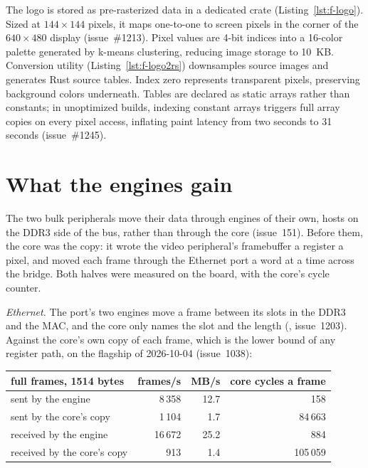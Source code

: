 \documentclass[journal,9pt]{IEEEtran}
\begin{document}


The logo is stored as pre-rasterized data in a dedicated crate
(Listing~\ref{lst:f-logo}). Sized at $144\times144$ pixels, it maps one-to-one
to screen pixels in the corner of the $640\times480$ display (issue~\#1213).
Pixel values are 4-bit indices into a 16-color palette generated by k-means
clustering, reducing image storage to 10~KB. Conversion utility
 (Listing~\ref{lst:f-logo2rs}) downsamples source images
and generates Rust source tables. Index zero represents transparent pixels,
preserving background colors underneath. Tables are declared as static arrays
rather than constants; in unoptimized builds, indexing constant arrays triggers
full array copies on every pixel access, inflating paint latency from two
seconds to 31 seconds (issue~\#1245).





\section{What the engines gain}
\label{sec:f-dma}

The two bulk peripherals move their data through engines of their own,
hosts on the DDR3 side of the bus, rather than through the core
(issue~151). Before them, the core was the copy: it wrote the video
peripheral's framebuffer a register a pixel, and moved each frame
through the Ethernet port a word at a time across the bridge. Both
halves were measured on the board, with the core's cycle counter.

\emph{Ethernet.} The port's two engines move a frame between its slots
in the DDR3 and the MAC, and the core only names the slot and the
length (, issue~1203). Against the core's own copy of
each frame, which is the lower bound of any register path, on the
flagship of 2026-10-04 (issue~1038):

\begin{center}\footnotesize
\begin{tabular}{@{}lrrr@{}}
\toprule
full frames, 1514 bytes & frames/s & MB/s & core cycles a frame \\
\midrule
sent by the engine & 8\,358 & 12.7 & 158 \\
sent by the core's copy & 1\,104 & 1.7 & 84\,663 \\
received by the engine & 16\,672 & 25.2 & 884 \\
received by the core's copy & 913 & 1.4 & 105\,059 \\
\bottomrule
\end{tabular}
\end{center}
\end{document}
